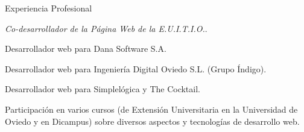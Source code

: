 
\begin{rubric}{Experiencia Profesional}


  \entry*[Del 02/2005 \\al 06/2006]
  \emph{Co-desarrollador de la Página Web de la E.U.I.T.I.O.}.

  \entry*[Del 10/2006 al 06/2007]
  Desarrollador web para Dana Software S.A.

  \entry*[Del 04/2008 al 02/2010]
  Desarrollador web para Ingeniería Digital Oviedo S.L. (Grupo Índigo).

  \entry*[Desde el 02/2010]
  Desarrollador web para Simplelógica y The Cocktail.


  \entry*[2008-2010]
  Participación en varios cursos (de Extensión Universitaria en la Universidad de Oviedo y en Dicampus) sobre diversos aspectos y tecnologías de desarrollo web.


\end{rubric}

